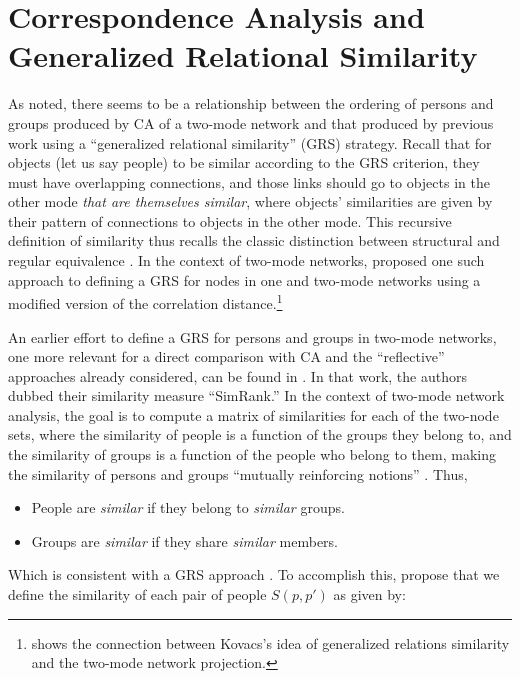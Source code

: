 \documentclass[a4paper,fleqn]{cas-sc}
\begin{document}
\section{Correspondence Analysis and Generalized Relational Similarity} \label{sec:cagensim}
As noted, there seems to be a relationship between the ordering of persons and groups produced by CA of a two-mode network and that produced by previous work using a ``generalized relational similarity'' (GRS) strategy. Recall that for objects (let us say people) to be similar according to the GRS criterion, they must have overlapping connections, and those links should go to objects in the other mode \textit{that are themselves similar}, where objects' similarities are given by their pattern of connections to objects in the other mode. This recursive definition of similarity thus recalls the classic distinction between structural and regular equivalence \citep{everett1994regular}. In the context of two-mode networks, \citet{kovacs2010generalized} proposed one such approach to defining a GRS for nodes in one and two-mode networks using a modified version of the correlation distance.\footnote{\citet{lizardo2024two} shows the connection between Kovacs's idea of generalized relations similarity and the two-mode network projection.}

An earlier effort to define a GRS for persons and groups in two-mode networks, one more relevant for a direct comparison with CA and the ``reflective'' approaches already considered, can be found in \citet{jeh2002simrank}. In that work, the authors dubbed their similarity measure ``SimRank.'' In the context of two-mode network analysis, the goal is to compute a matrix of similarities for each of the two-node sets, where the similarity of people is a function of the groups they belong to, and the similarity of groups is a function of the people who belong to them, making the similarity of persons and groups ``mutually reinforcing notions'' \citep[540]{jeh2002simrank}. Thus,

\begin{itemize}
    \item People are \textit{similar} if they belong to \textit{similar} groups.
    \item Groups are \textit{similar} if they share \textit{similar} members.
\end{itemize}

Which is consistent with a GRS approach \citep[see][]{kovacs2010generalized, lizardo2024two}. To accomplish this, \citet[540, eq. 2 and eq. 3]{jeh2002simrank} propose that we define the similarity of each pair of people $S(p, p')$  as given by:
\end{document}
